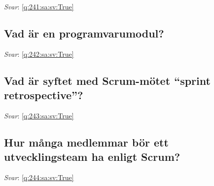 \documentclass[a4paper,11pt,oneside]{article}
\begin{document}
\begin{sloppypar}
\label{q:241:sa:sv:False}

\vspace{2cm}

\noindent\makebox[\textwidth]{\hrulefill}

\vspace{1cm}

\textit{Svar}: \autoref{q:241:sa:sv:True}



\subsection{Vad \"ar en programvarumodul?}

\label{q:242:sa:sv:False}

\vspace{2cm}

\noindent\makebox[\textwidth]{\hrulefill}

\vspace{1cm}

\textit{Svar}: \autoref{q:242:sa:sv:True}



\subsection{Vad \"ar syftet med Scrum-m\"otet {\textquotedblleft}sprint retrospective{\textquotedblright}?}

\label{q:243:sa:sv:False}

\vspace{2cm}

\noindent\makebox[\textwidth]{\hrulefill}

\vspace{1cm}

\textit{Svar}: \autoref{q:243:sa:sv:True}



\subsection{Hur m\r{a}nga medlemmar b\"or ett utvecklingsteam ha enligt Scrum?}

\label{q:244:sa:sv:False}

\vspace{2cm}

\noindent\makebox[\textwidth]{\hrulefill}

\vspace{1cm}

\textit{Svar}: \autoref{q:244:sa:sv:True}




\end{sloppypar}
\end{document}

